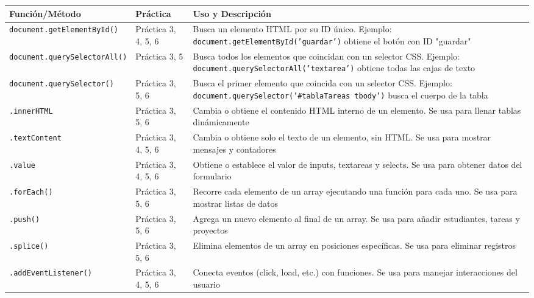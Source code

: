 \documentclass[12pt,a4paper]{article}
\begin{document}
\begin{longtable}{|p{3cm}|p{4cm}|p{8cm}|}
\hline
\rowcolor{lightgray}
\textbf{Función/Método} & \textbf{Práctica} & \textbf{Uso y Descripción} \\
\hline

\texttt{document.getElementById()} & Práctica 3, 4, 5, 6 & Busca un elemento HTML por su ID único. Ejemplo: \texttt{document.getElementById('guardar')} obtiene el botón con ID "guardar" \\
\hline

\texttt{document.querySelectorAll()} & Práctica 3, 5 & Busca todos los elementos que coincidan con un selector CSS. Ejemplo: \texttt{document.querySelectorAll('textarea')} obtiene todas las cajas de texto \\
\hline

\texttt{document.querySelector()} & Práctica 3, 5, 6 & Busca el primer elemento que coincida con un selector CSS. Ejemplo: \texttt{document.querySelector('\#tablaTareas tbody')} busca el cuerpo de la tabla \\
\hline

\texttt{.innerHTML} & Práctica 3, 5, 6 & Cambia o obtiene el contenido HTML interno de un elemento. Se usa para llenar tablas dinámicamente \\
\hline

\texttt{.textContent} & Práctica 3, 4, 5, 6 & Cambia o obtiene solo el texto de un elemento, sin HTML. Se usa para mostrar mensajes y contadores \\
\hline

\texttt{.value} & Práctica 3, 4, 5, 6 & Obtiene o establece el valor de inputs, textareas y selects. Se usa para obtener datos del formulario \\
\hline

\texttt{.forEach()} & Práctica 3, 5, 6 & Recorre cada elemento de un array ejecutando una función para cada uno. Se usa para mostrar listas de datos \\
\hline

\texttt{.push()} & Práctica 3, 5, 6 & Agrega un nuevo elemento al final de un array. Se usa para añadir estudiantes, tareas y proyectos \\
\hline

\texttt{.splice()} & Práctica 3, 5, 6 & Elimina elementos de un array en posiciones específicas. Se usa para eliminar registros \\
\hline

\texttt{.addEventListener()} & Práctica 3, 4, 5, 6 & Conecta eventos (click, load, etc.) con funciones. Se usa para manejar interacciones del usuario \\
\hline


\end{longtable}
\end{document}
